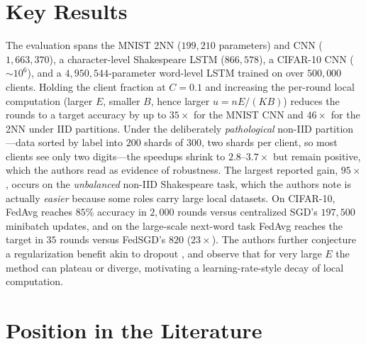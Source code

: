 \documentclass[11pt]{article}
\begin{document}
\section{Key Results}

The evaluation spans the MNIST 2NN ($199{,}210$ parameters) and CNN ($1{,}663{,}370$), a character-level Shakespeare LSTM ($866{,}578$), a CIFAR-10 CNN ($\sim\!10^6$), and a $4{,}950{,}544$-parameter word-level LSTM trained on over $500{,}000$ clients. Holding the client fraction at $C=0.1$ and increasing the per-round local computation (larger $E$, smaller $B$, hence larger $u=nE/(KB)$) reduces the rounds to a target accuracy by up to $35\times$ for the MNIST CNN and $46\times$ for the 2NN under IID partitions. Under the deliberately \emph{pathological} non-IID partition---data sorted by label into $200$ shards of $300$, two shards per client, so most clients see only two digits---the speedups shrink to $2.8$--$3.7\times$ but remain positive, which the authors read as evidence of robustness. The largest reported gain, $95\times$, occurs on the \emph{unbalanced} non-IID Shakespeare task, which the authors note is actually \emph{easier} because some roles carry large local datasets. On CIFAR-10, FedAvg reaches $85\%$ accuracy in $2{,}000$ rounds versus centralized SGD's $197{,}500$ minibatch updates, and on the large-scale next-word task FedAvg reaches the target in $35$ rounds versus FedSGD's $820$ ($23\times$). The authors further conjecture a regularization benefit akin to dropout \citep{srivastava2014dropout}, and observe that for very large $E$ the method can plateau or diverge, motivating a learning-rate-style decay of local computation.

\section{Position in the Literature}
\end{document}
